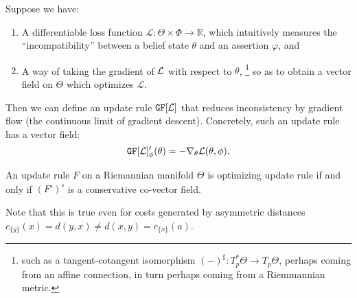 Suppose we have:
\begin{enumerate}[nosep]
	\item A differentiable loss function $\mathcal L : \Theta \times \Phi  \to \mathbb R$, which intuitively measures the ``incompatibility'' between a belief state $\theta$ and an assertion $\varphi$, and
	\item
		A way of taking the gradient of ${\cal L}$ with respect to $\theta$,%
			\footnote{
			such as a tangent-cotangent isomorphism $(-)^\sharp : T^*_p\Theta \to T_p \Theta$, perhaps coming from an affine connection, in turn perhaps coming from a Riemmannian metric.}
        so as to obtain a vector field on $\Theta$ which optimizes $\mathcal L.$
\end{enumerate}
\def\GD#1{\mathtt{GF}[#1]}
\def\NGD#1{\mathtt{NGF}[#1]}

Then we can define an update rule $\GD {\cal L}$ that reduces inconsistency by gradient flow (the continuous limit of gradient descent). Concretely, such an update rule has a vector field:
\[
	\GD {\cal L}'_\phi(\theta) = - \nabla_\theta {\cal L}(\theta,\phi).
\]


\begin{prop}
	An update rule $F$ on a Riemannian manifold $\Theta$ is optimizing update rule if and only if $(F')^\flat$ is a conservative co-vector field.
	\cite[Prop 11.40]{lee2013smooth}
\end{prop}


Note that this is true even for costs generated by asymmetric distances $c_{\{y\}}(x) = d(y, x) \ne d(x,y) = c_{\{x\}}(a)$.



